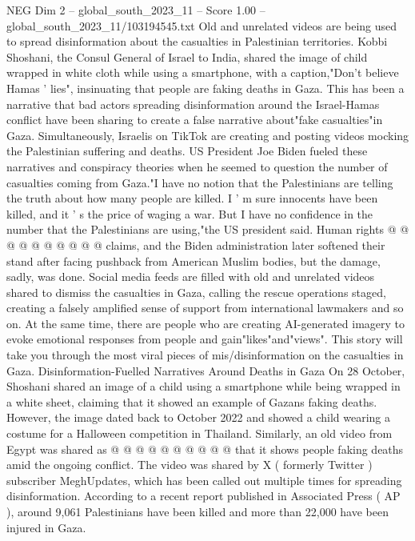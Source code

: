 \begin{textsample}{NEG Dim 2 – global\_south\_2023\_11 – Score 1.00 – global\_south\_2023\_11/103194545.txt}  \label{ex:f2_neg_230}
Old and unrelated videos are being used to spread disinformation about the casualties in Palestinian territories.
Kobbi Shoshani, the Consul General of Israel to India, shared the image of child wrapped in white cloth while using a smartphone, with a caption,"Don't believe Hamas ' lies", insinuating that people are faking deaths in Gaza.
This has been a narrative that bad actors spreading disinformation around the Israel-Hamas conflict have been sharing to create a false narrative about"fake casualties"in Gaza.
Simultaneously, Israelis on TikTok are creating and posting videos mocking the Palestinian suffering and deaths.
US President Joe Biden fueled these narratives and conspiracy theories when he seemed to question the number of casualties coming from Gaza."I have no notion that the Palestinians are telling the truth about how many people are killed.
I ' m sure innocents have been killed, and it ' s the price of waging a war.
But I have no confidence in the number that the Palestinians are using,"the US president said.
Human rights @ @ @ @ @ @ @ @ @ @ claims, and the Biden administration later softened their stand after facing pushback from American Muslim bodies, but the damage, sadly, was done.
Social media feeds are filled with old and unrelated videos shared to dismiss the casualties in Gaza, calling the rescue operations staged, creating a falsely amplified sense of support from international lawmakers and so on.
At the same time, there are people who are creating AI-generated imagery to evoke emotional responses from people and gain"likes"and"views".
This story will take you through the most viral pieces of mis/disinformation on the casualties in Gaza.
Disinformation-Fuelled Narratives Around Deaths in Gaza On 28 October, Shoshani shared an image of a child using a smartphone while being wrapped in a white sheet, claiming that it showed an example of Gazans faking deaths.
However, the image dated back to October 2022 and showed a child wearing a costume for a Halloween competition in Thailand.
Similarly, an old video from Egypt was shared as @ @ @ @ @ @ @ @ @ @ that it shows people faking deaths amid the ongoing conflict.
The video was shared by X ( formerly Twitter ) subscriber MeghUpdates, which has been called out multiple times for spreading disinformation.
According to a recent report published in Associated Press ( AP ), around 9,061 Palestinians have been killed and more than 22,000 have been injured in Gaza.

\end{textsample}
